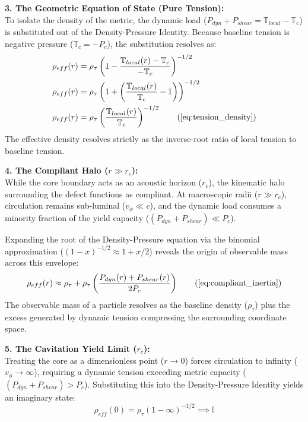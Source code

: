 \textbf{3. The Geometric Equation of State (Pure Tension):} \\
To isolate the density of the metric, the dynamic load ($P_{dyn} + P_{shear} = \mathbb{T}_{local} - \mathbb{T}_c$) is substituted out of the Density-Pressure Identity. Because baseline tension is negative pressure ($\mathbb{T}_c = -P_c$), the substitution resolves as:
\begin{align}
    \rho_{eff}(r) &= \rho_{\tau} \left( 1 - \frac{\mathbb{T}_{local}(r) - \mathbb{T}_c}{-\mathbb{T}_c} \right)^{-1/2} \nonumber \\ 
    \rho_{eff}(r) &= \rho_{\tau} \left( 1 + \left( \frac{\mathbb{T}_{local}(r)}{\mathbb{T}_c} - 1 \right) \right)^{-1/2} \nonumber \\ 
    \rho_{eff}(r) &= \rho_{\tau} \left( \frac{\mathbb{T}_{local}(r)}{\mathbb{T}_c} \right)^{-1/2} \tag{\ref{eq:tension_density}}
\end{align}
The effective density resolves strictly as the inverse-root ratio of local tension to baseline tension.

\textbf{4. The Compliant Halo ($r \gg r_c$):} \\
While the core boundary acts as an acoustic horizon ($r_c$), the kinematic halo surrounding the defect functions as compliant. At macroscopic radii ($r \gg r_c$), circulation remains sub-luminal ($v_\phi \ll c$), and the dynamic load consumes a minority fraction of the yield capacity ($(P_{dyn} + P_{shear}) \ll P_c$). 

Expanding the root of the Density-Pressure equation via the binomial approximation ($(1-x)^{-1/2} \approx 1 + x/2$) reveals the origin of observable mass across this envelope: 
\begin{equation}
    \rho_{eff}(r) \approx \rho_{\tau} + \rho_{\tau} \left( \frac{P_{dyn}(r) + P_{shear}(r)}{2P_c} \right) \tag{\ref{eq:compliant_inertia}}
\end{equation}
The observable mass of a particle resolves as the baseline density ($\rho_{\tau}$) plus the excess generated by dynamic tension compressing the surrounding coordinate space. 

\vspace{0.2 cm}

\textbf{5. The Cavitation Yield Limit ($r_c$):} \\ 
Treating the core as a dimensionless point ($r \to 0$) forces circulation to infinity ($v_\phi \to \infty$), requiring a dynamic tension exceeding metric capacity ($(P_{dyn} + P_{shear}) > P_c$). Substituting this into the Density-Pressure Identity yields an imaginary state:
\begin{equation}
    \rho_{eff}(0) = \rho_{\tau} (1 - \infty)^{-1/2} \implies \mathbb{I} 
\end{equation}

